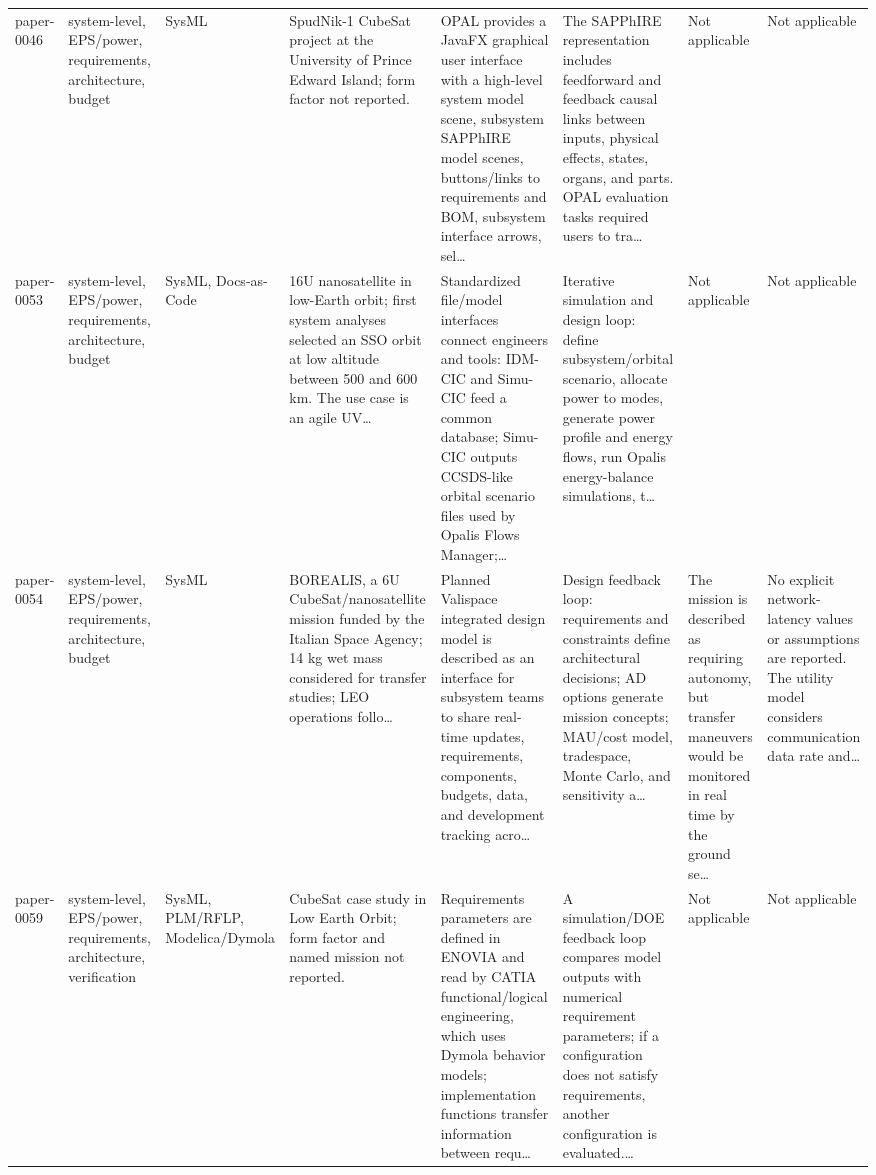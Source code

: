 \documentclass[10pt]{article}
\begin{document}
\begin{landscape}
\begin{longtable}{p{1.1cm}p{3.1cm}p{2.5cm}p{3.3cm}p{4.0cm}p{3.5cm}p{2.8cm}p{2.8cm}}
paper-0046 & system-level, EPS/power, requirements, architecture, budget & SysML & SpudNik-1 CubeSat project at the University of Prince Edward Island; form factor not reported. & OPAL provides a JavaFX graphical user interface with a high-level system model scene, subsystem SAPPhIRE model scenes, buttons/links to requirements and BOM, subsystem interface arrows, sel… & The SAPPhIRE representation includes feedforward and feedback causal links between inputs, physical effects, states, organs, and parts. OPAL evaluation tasks required users to tra… & Not applicable & Not applicable \\
paper-0053 & system-level, EPS/power, requirements, architecture, budget & SysML, Docs-as-Code & 16U nanosatellite in low-Earth orbit; first system analyses selected an SSO orbit at low altitude between 500 and 600 km. The use case is an agile UV… & Standardized file/model interfaces connect engineers and tools: IDM-CIC and Simu-CIC feed a common database; Simu-CIC outputs CCSDS-like orbital scenario files used by Opalis Flows Manager;… & Iterative simulation and design loop: define subsystem/orbital scenario, allocate power to modes, generate power profile and energy flows, run Opalis energy-balance simulations, t… & Not applicable & Not applicable \\
paper-0054 & system-level, EPS/power, requirements, architecture, budget & SysML & BOREALIS, a 6U CubeSat/nanosatellite mission funded by the Italian Space Agency; 14 kg wet mass considered for transfer studies; LEO operations follo… & Planned Valispace integrated design model is described as an interface for subsystem teams to share real-time updates, requirements, components, budgets, data, and development tracking acro… & Design feedback loop: requirements and constraints define architectural decisions; AD options generate mission concepts; MAU/cost model, tradespace, Monte Carlo, and sensitivity a… & The mission is described as requiring autonomy, but transfer maneuvers would be monitored in real time by the ground se… & No explicit network-latency values or assumptions are reported. The utility model considers communication data rate and… \\
paper-0059 & system-level, EPS/power, requirements, architecture, verification & SysML, PLM/RFLP, Modelica/Dymola & CubeSat case study in Low Earth Orbit; form factor and named mission not reported. & Requirements parameters are defined in ENOVIA and read by CATIA functional/logical engineering, which uses Dymola behavior models; implementation functions transfer information between requ… & A simulation/DOE feedback loop compares model outputs with numerical requirement parameters; if a configuration does not satisfy requirements, another configuration is evaluated.… & Not applicable & Not applicable \\

\end{longtable}
\end{landscape}
\end{document}
